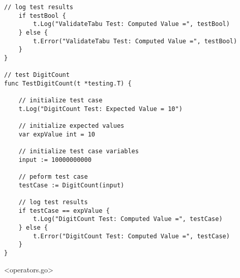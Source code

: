 \begin{lstlisting}[basicstyle=\tiny]
	// log test results
	if testBool {
		t.Log("ValidateTabu Test: Computed Value =", testBool)
	} else {
		t.Error("ValidateTabu Test: Computed Value =", testBool)
	}
}

// test DigitCount
func TestDigitCount(t *testing.T) {

	// initialize test case
	t.Log("DigitCount Test: Expected Value = 10")

	// initialize expected values
	var expValue int = 10

	// initialize test case variables
	input := 10000000000

	// peform test case
	testCase := DigitCount(input)

	// log test results
	if testCase == expValue {
		t.Log("DigitCount Test: Computed Value =", testCase)
	} else {
		t.Error("DigitCount Test: Computed Value =", testCase)
	}
}

\end{lstlisting}

\newpage

<operators.go>


